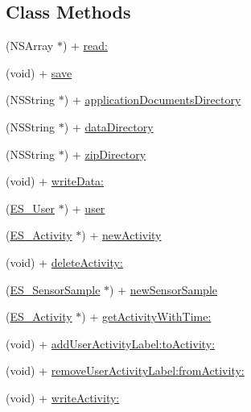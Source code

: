 \subsection*{Class Methods}
\begin{DoxyCompactItemize}
\item 
(N\+S\+Array $\ast$) + \hyperlink{interface_e_s___data_base_accessor_a1f57d49ccc93c468c502e4644e546052}{read\+:}
\item 
(void) + \hyperlink{interface_e_s___data_base_accessor_a0f344c04f579b32134fc134711726165}{save}
\item 
(N\+S\+String $\ast$) + \hyperlink{interface_e_s___data_base_accessor_ae6fd9bb34a2eb8ebca9fce80db8580f5}{application\+Documents\+Directory}
\item 
(N\+S\+String $\ast$) + \hyperlink{interface_e_s___data_base_accessor_a062c949cf23e1a93e8141f0aa385aa42}{data\+Directory}
\item 
(N\+S\+String $\ast$) + \hyperlink{interface_e_s___data_base_accessor_a43f88ef88358f73172e5991b7d3f154d}{zip\+Directory}
\item 
(void) + \hyperlink{interface_e_s___data_base_accessor_a13349405c9a70f3ca2e3c1d7c386bb7b}{write\+Data\+:}
\item 
(\hyperlink{interface_e_s___user}{E\+S\+\_\+\+User} $\ast$) + \hyperlink{interface_e_s___data_base_accessor_a56762a8737ae98bf4baf9f6b7afa00ff}{user}
\item 
(\hyperlink{interface_e_s___activity}{E\+S\+\_\+\+Activity} $\ast$) + \hyperlink{interface_e_s___data_base_accessor_a79a5b4644598b8df9c40bf58e298ce48}{new\+Activity}
\item 
(void) + \hyperlink{interface_e_s___data_base_accessor_aaad97415d1728b4b4c6a82c11bd9b64d}{delete\+Activity\+:}
\item 
(\hyperlink{interface_e_s___sensor_sample}{E\+S\+\_\+\+Sensor\+Sample} $\ast$) + \hyperlink{interface_e_s___data_base_accessor_aace083c0d4a0e2cfc30d9b1607e07139}{new\+Sensor\+Sample}
\item 
(\hyperlink{interface_e_s___activity}{E\+S\+\_\+\+Activity} $\ast$) + \hyperlink{interface_e_s___data_base_accessor_ad739f38d4c9830e1c54629f2dee3f813}{get\+Activity\+With\+Time\+:}
\item 
(void) + \hyperlink{interface_e_s___data_base_accessor_a76357942f1c5a38b75aa8afb39eda365}{add\+User\+Activity\+Label\+:to\+Activity\+:}
\item 
(void) + \hyperlink{interface_e_s___data_base_accessor_a8213f97ef962ea7902de5669af9b77dc}{remove\+User\+Activity\+Label\+:from\+Activity\+:}
\item 
(void) + \hyperlink{interface_e_s___data_base_accessor_a2d4c9e685d7a2b6971023861e6ffde9e}{write\+Activity\+:}
\end{DoxyCompactItemize}


